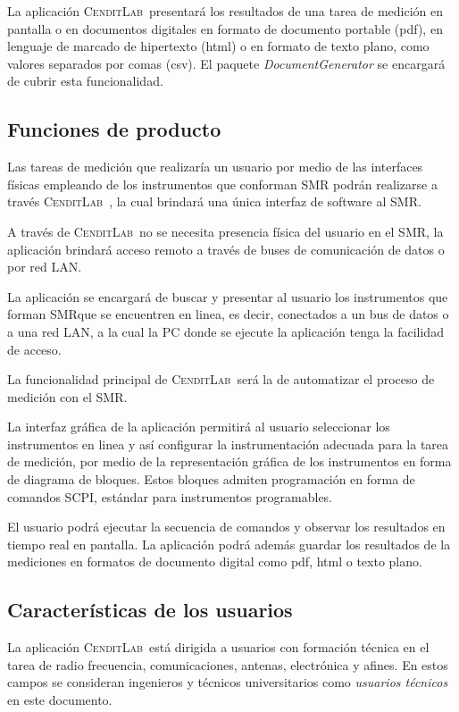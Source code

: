 \documentclass[paper=a4,oneside,fontsize=12pt]{article}
\newcommand{\AppName}{\textsc{CenditLab}\ }
\newcommand{\SMR}{SMR}
\begin{document}
	La aplicación \AppName presentará los resultados de una tarea de medición en pantalla o en documentos digitales en formato de documento portable (pdf), en lenguaje de marcado de hipertexto (html) o en formato de texto plano, como valores separados por comas (csv). El paquete \emph{DocumentGenerator} se encargará de cubrir esta funcionalidad.
	
	\subsection{Funciones de producto}
	
	Las tareas de medición que realizaría un usuario por medio de las interfaces físicas empleando de los instrumentos que conforman \SMR 
	podrán realizarse a través \AppName, la cual brindará una única interfaz de software al \SMR. 
	
	A través de \AppName no se necesita presencia física del usuario en el \SMR, la aplicación brindará acceso remoto a través de buses de comunicación de datos o por red LAN. 
	
	La aplicación se encargará de buscar y presentar al usuario los instrumentos que forman \SMR que se encuentren en linea, es decir, conectados a un bus de datos o a una red LAN, a la cual la PC donde se ejecute la aplicación tenga la facilidad de acceso.
	
	La funcionalidad principal de \AppName será la de automatizar el proceso de medición con el  \SMR. 
	
	La interfaz gráfica de la aplicación permitirá al usuario seleccionar los instrumentos en linea y así configurar la instrumentación adecuada para la tarea de medición, por medio de la representación gráfica de los instrumentos en forma de diagrama de bloques. Estos bloques admiten programación en forma de comandos SCPI,  estándar para instrumentos programables.
	
	El usuario podrá ejecutar la secuencia de comandos y observar los resultados en tiempo real en pantalla. La aplicación podrá además guardar los resultados de la mediciones en formatos de documento digital como pdf, html o texto plano.		
	
	\subsection{Características de los usuarios}
	
	La aplicación \AppName está dirigida a usuarios con formación técnica en el tarea de radio frecuencia, comunicaciones, antenas, electrónica y afines. En estos campos se  consideran ingenieros y técnicos universitarios como \emph{usuarios técnicos} en este documento.
	
\end{document}
